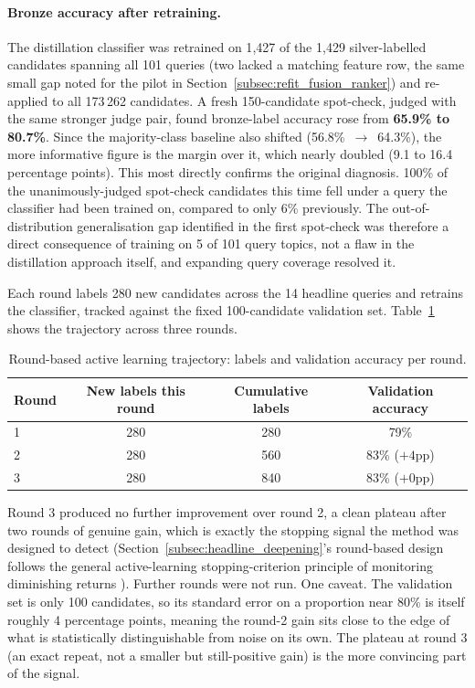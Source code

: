 \documentclass[a4paper,oneside,bibliography=totoc]{scrbook}
\begin{document}
\paragraph{Bronze accuracy after retraining.} The distillation classifier was retrained on 1{,}427 of the 1{,}429 silver-labelled candidates spanning all 101 queries (two lacked a matching feature row, the same small gap noted for the pilot in Section~\ref{subsec:refit_fusion_ranker}) and re-applied to all 173\,262 candidates. A fresh 150-candidate spot-check, judged with the same stronger judge pair, found bronze-label accuracy rose from \textbf{65.9\% to 80.7\%}. Since the majority-class baseline also shifted (56.8\%~$\to$~64.3\%), the more informative figure is the margin over it, which nearly doubled (9.1 to 16.4 percentage points). This most directly confirms the original diagnosis. 100\% of the unanimously-judged spot-check candidates this time fell under a query the classifier had been trained on, compared to only 6\% previously. The out-of-distribution generalisation gap identified in the first spot-check was therefore a direct consequence of training on 5 of 101 query topics, not a flaw in the distillation approach itself, and expanding query coverage resolved it.

\label{subsec:headline_deepening_result}

Each round labels 280 new candidates across the 14 headline queries and retrains the classifier, tracked against the fixed 100-candidate validation set. Table~\ref{tab:headline_rounds} shows the trajectory across three rounds.

\begin{table}[ht]
\centering
\caption{Round-based active learning trajectory: labels and validation accuracy per round.}
\label{tab:headline_rounds}
\begin{tabular}{lccc}
\toprule
\textbf{Round} & \textbf{New labels this round} & \textbf{Cumulative labels} & \textbf{Validation accuracy} \\
\midrule
1 & 280 & 280 & 79\% \\
2 & 280 & 560 & 83\% ($+4$pp) \\
3 & 280 & 840 & 83\% ($+0$pp) \\
\bottomrule
\end{tabular}
\end{table}

Round 3 produced no further improvement over round 2, a clean plateau after two rounds of genuine gain, which is exactly the stopping signal the method was designed to detect (Section~\ref{subsec:headline_deepening}'s round-based design follows the general active-learning stopping-criterion principle of monitoring diminishing returns \citep{settles2009active}). Further rounds were not run. One caveat. The validation set is only 100 candidates, so its standard error on a proportion near 80\% is itself roughly 4 percentage points, meaning the round-2 gain sits close to the edge of what is statistically distinguishable from noise on its own. The plateau at round 3 (an exact repeat, not a smaller but still-positive gain) is the more convincing part of the signal.
\end{document}
